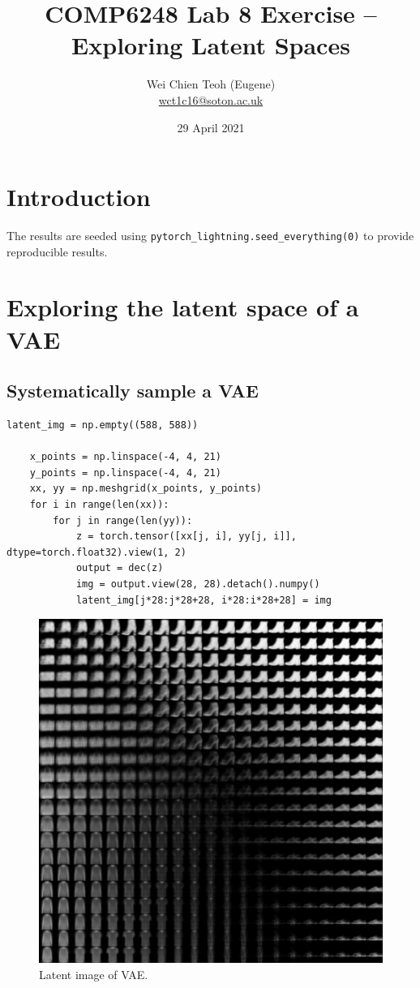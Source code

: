 \documentclass[twocolumn]{article}
\title{\Large COMP6248 Lab 8 Exercise -- Exploring Latent Spaces}
\author{\small Wei Chien Teoh (Eugene)\\\bigskip \href{mailto:wct1c16@soton.ac.uk}{wct1c16@soton.ac.uk}}
\date{\small 29 April 2021}
\begin{document}
\maketitle

\section*{Introduction}

The results are seeded using \lstinline{pytorch_lightning.seed_everything(0)} to provide reproducible results.

\section{Exploring the latent space of a VAE}

\subsection{Systematically sample a VAE}

\begin{lstlisting}[caption={Code to generate latent image.}]
    latent_img = np.empty((588, 588))

    x_points = np.linspace(-4, 4, 21)
    y_points = np.linspace(-4, 4, 21)
    xx, yy = np.meshgrid(x_points, y_points)
    for i in range(len(xx)):
        for j in range(len(yy)):
            z = torch.tensor([xx[j, i], yy[j, i]], dtype=torch.float32).view(1, 2)
            output = dec(z)
            img = output.view(28, 28).detach().numpy()
            latent_img[j*28:j*28+28, i*28:i*28+28] = img
\end{lstlisting}

\begin{figure}[H]
    \includegraphics[width=\linewidth]{Figures/latent_img.pdf}
    \caption{Latent image of VAE.}
    \label{fig:latent-img}
\end{figure}
\end{document}
